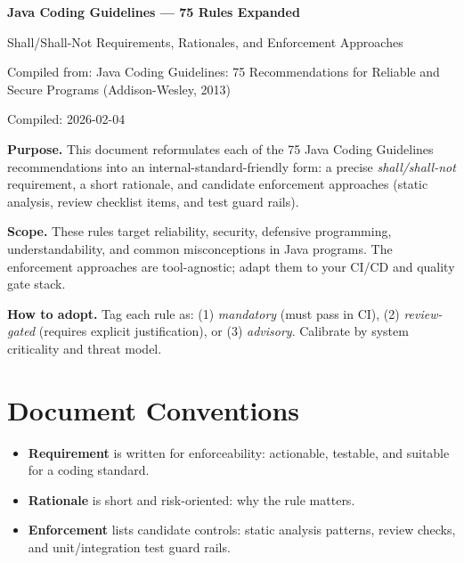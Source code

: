 \documentclass[11pt]{article}
\begin{document}
\hypersetup{pageanchor=false}
\begin{titlepage}
\centering
{\LARGE\bfseries Java Coding Guidelines — 75 Rules Expanded\par}
\vspace{0.5em}
{\large Shall/Shall-Not Requirements, Rationales, and Enforcement Approaches\par}
\vspace{1.5em}
{\normalsize Compiled from: Java Coding Guidelines: 75 Recommendations for Reliable and Secure Programs (Addison-Wesley, 2013)\par}
\vfill
{\normalsize Compiled: 2026-02-04\par}
\vspace{1.5em}
\begin{minipage}{0.92\textwidth}
\small
\textbf{Purpose.} This document reformulates each of the 75 Java Coding Guidelines recommendations into an internal-standard-friendly form: a precise \emph{shall/shall-not} requirement, a short rationale, and candidate enforcement approaches (static analysis, review checklist items, and test guard rails).
\par\medskip
\textbf{Scope.} These rules target reliability, security, defensive programming, understandability, and common misconceptions in Java programs. The enforcement approaches are tool-agnostic; adapt them to your CI/CD and quality gate stack.
\par\medskip
\textbf{How to adopt.} Tag each rule as: (1) \emph{mandatory} (must pass in CI), (2) \emph{review-gated} (requires explicit justification), or (3) \emph{advisory}. Calibrate by system criticality and threat model.
\end{minipage}
\end{titlepage}
\hypersetup{pageanchor=true}

\tableofcontents
\newpage

\section*{Document Conventions}
\begin{itemize}
\item \textbf{Requirement} is written for enforceability: actionable, testable, and suitable for a coding standard.
\item \textbf{Rationale} is short and risk-oriented: why the rule matters.
\item \textbf{Enforcement} lists candidate controls: static analysis patterns, review checks, and unit/integration test guard rails.
\end{itemize}
\end{document}
